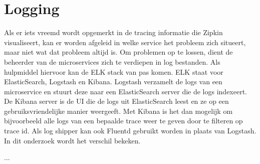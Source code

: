 \section{Logging}
\label{sec:logging}

Als er iets vreemd wordt opgemerkt in de tracing informatie die Zipkin visualiseert, kan er worden afgeleid in welke service het probleem zich situeert, maar niet wat dat probleem altijd is. Om problemen op te lossen, dient de beheerder van de microservices zich te verdiepen in log bestanden. Als hulpmiddel hiervoor kan de ELK stack van pas komen. ELK staat voor ElasticSearch, Logstash en Kibana. Logstash verzamelt de logs van een microservice en stuurt deze naar een ElasticSearch server die de logs indexeert. De Kibana server is de UI die de logs uit ElasticSearch leest en ze op een gebruiksvriendelijke manier weergeeft. Met Kibana is het dan mogelijk om bijvoorbeeld alle logs van een bepaalde trace weer te geven door te filteren op trace id. Als log shipper kan ook Fluentd gebruikt worden in plaats van Logstash. In dit onderzoek wordt het verschil bekeken.

...